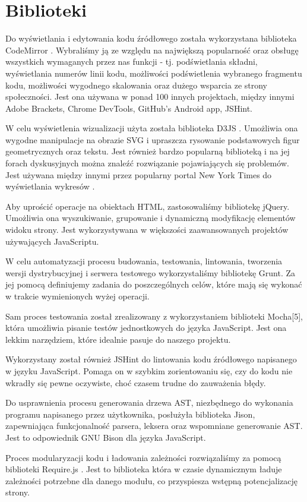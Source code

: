 \documentclass[a4paper,twoside,openright,11pt]{report}
\begin{document}
  \section{Biblioteki}
\par Do wyświetlania i edytowania kodu źródłowego została wykorzystana biblioteka CodeMirror \cite{cm}. Wybraliśmy ją ze względu na największą popularność oraz obsługę wszystkich wymaganych przez nas funkcji - tj. podświetlania składni, wyświetlania numerów linii kodu, możliwości podświetlenia wybranego fragmentu kodu, możliwości wygodnego skalowania oraz dużego wsparcia ze strony społeczności. Jest ona używana w ponad 100 innych projektach, między innymi Adobe Brackets, Chrome DevTools, GitHub's Android app, JSHint. \cite{jshint}
\par W celu wyświetlenia wizualizacji użyta została biblioteka D3JS \cite{d3js}. Umożliwia ona wygodne manipulacje na obrazie SVG i upraszcza rysowanie podstawowych figur geometrycznych oraz tekstu. Jest również bardzo popularną biblioteką i na jej forach dyskusyjnych można znaleźć rozwiązanie pojawiających się problemów. Jest używana między innymi przez popularny portal New York Times do wyświetlania wykresów \cite{ny}.
\par Aby uprościć operacje na obiektach HTML, zastosowaliśmy bibliotekę jQuery. \cite{jquery} Umożliwia ona wyszukiwanie, grupowanie i dynamiczną modyfikację elementów widoku strony. Jest wykorzystywana w większości zaawansowanych projektów używających JavaScriptu.
\par W celu automatyzacji procesu budowania, testowania, lintowania, tworzenia wersji dystrybucyjnej i serwera testowego wykorzystaliśmy bibliotekę Grunt.\cite{gruntjs} Za jej pomocą definiujemy zadania do poszczególnych celów, które mają się wykonać w trakcie wymienionych wyżej operacji. 
\par Sam proces testowania został zrealizowany z wykorzystaniem biblioteki Mocha[5], która umożliwia pisanie testów jednostkowych do języka JavaScript. Jest ona lekkim narzędziem, które idealnie pasuje do naszego projektu.
\par Wykorzystany został również JSHint\cite{jshint} do lintowania kodu źródłowego napisanego w języku JavaScript. Pomaga on w szybkim zorientowaniu się, czy do kodu nie wkradły się pewne oczywiste, choć czasem trudne do zauważenia błędy.
\par Do usprawnienia procesu generowania drzewa AST, niezbędnego do wykonania programu napisanego przez użytkownika, posłużyła biblioteka Jison\cite{jison}, zapewniająca funkcjonalność parsera, leksera oraz wspomniane generowanie AST. Jest to odpowiednik GNU Bison dla języka JavaScript.
\par Proces modularyzacji kodu i ładowania zależności rozwiązaliśmy za pomocą biblioteki Require.js \cite{requirejs}. Jest to biblioteka która w czasie dynamicznym ładuje zależności potrzebne dla danego modułu, co przyspiesza wstępną potencjalizację strony. 
\end{document}
